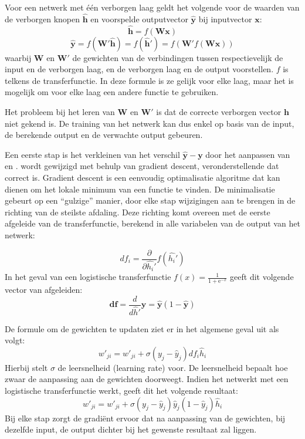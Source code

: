 Voor een netwerk met \'e\'en verborgen laag geldt het volgende voor de waarden van de verborgen knopen $\mathbf{\hat{h}}$ en voorspelde outputvector $\mathbf{\hat{y}}$ bij inputvector $\mathbf{x}$:
\begin{equation}
    \mathbf{\hat{h}} = f(\mathbf{Wx})
\end{equation}
\begin{equation}
    \boldsymbol{\hat{y}} = f(\boldsymbol{W'\hat{h}}) = f(\boldsymbol{\hat{h}'}) = f(\boldsymbol{W'}f(\boldsymbol{Wx}))
\end{equation}
waarbij $\mathbf{W}$ en $\mathbf{W'}$ de gewichten van de verbindingen tussen respectievelijk de input en de verborgen laag, en de verborgen laag en de output voorstellen. $f$ is telkens de transferfunctie. In deze formule is ze gelijk voor elke laag, maar het is mogelijk om voor elke laag een andere functie te gebruiken.

Het probleem bij het leren van $\mathbf{W}$ en $\mathbf{W'}$ is dat de correcte verborgen vector $\mathbf{h}$ niet gekend is. De training van het netwerk kan dus enkel op basis van de input, de  berekende output en de verwachte output gebeuren.

Een eerste stap is het verkleinen van het verschil $\mathbf{\hat{y}} - \mathbf{y}$ door het aanpassen van  en .  wordt gewijzigd met behulp van gradient descent, veronderstellende dat  correct is. Gradient descent is een eenvoudig optimalisatie algoritme dat kan dienen om het lokale minimum van een functie te vinden. De minimalisatie gebeurt op een ``gulzige'' manier, door elke stap wijzigingen aan te brengen in de richting van de steilste afdaling. Deze richting komt overeen met de eerste afgeleide van de transferfunctie, berekend in alle variabelen van de output van het netwerk:

\begin{equation}
df_i = \frac{\partial}{\partial\hat{h_i}'}f(\hat{h_i}')
\end{equation}
In het geval van een logistische transferfunctie $f(x) = \frac{1}{1 + \mathrm e^{-x}}$ geeft dit volgende vector van afgeleiden:
\begin{equation}
  \mathbf{df} = \frac{d}{d\hat{h}'}\mathbf{\hat{y}} = \mathbf{\hat{y}}(1-\mathbf{\hat{y}})
\end{equation}

De formule om de gewichten te updaten ziet er in het algemene geval uit als volgt:
\begin{equation}
  w'_{ji} = w'_{ji} + \sigma(y_j-\hat{y}_j)df_i\hat{h}_i
\end{equation}
Hierbij stelt $\sigma$ de leersnelheid (learning rate) voor. De leersnelheid bepaalt hoe zwaar de aanpassing aan de gewichten doorweegt.
Indien het netwerkt met een logistische transferfunctie werkt, geeft dit het volgende resultaat:
\begin{equation}
    w'_{ji} = w'_{ji} + \sigma(y_j-\hat{y}_j)\hat{y}_j(1-\hat{y}_j)\hat{h}_i
\end{equation}
Bij elke stap zorgt de gradi\"ent ervoor dat na aanpassing van de gewichten, bij dezelfde input, de output dichter bij het gewenste resultaat zal liggen.

